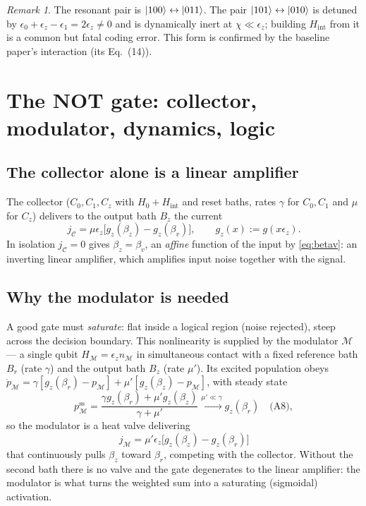 \documentclass[11pt,a4paper]{article}
\theoremstyle{plain}
\theoremstyle{definition}
\theoremstyle{remark}
\newtheorem{remark}{Remark}[section]
\newcommand{\calC}{\mathcal{C}}
\newcommand{\calM}{\mathcal{M}}
\newcommand{\gz}{g_z}
\begin{document}
\begin{remark}
The resonant pair is $\ket{100}\leftrightarrow\ket{011}$. The pair
$\ket{101}\leftrightarrow\ket{010}$ is detuned by
$\epsilon_0+\epsilon_z-\epsilon_1=2\epsilon_z\neq0$ and is dynamically
inert at $\chi\ll\epsilon_z$; building $H_{\mathrm{int}}$ from it is a
common but fatal coding error. This form is confirmed by the baseline
paper's interaction (its Eq.~(14)).
\end{remark}

\section{The NOT gate: collector, modulator, dynamics, logic}
\label{sec:notgate}

\subsection{The collector alone is a linear amplifier}
The collector ($C_0,C_1,C_z$ with $H_0+H_{\mathrm{int}}$ and reset baths,
rates $\gamma$ for $C_0,C_1$ and $\mu$ for $C_z$) delivers to the output
bath $B_z$ the current
\begin{equation}
j_{\calC}=\mu\epsilon_z\big[\gz(\beta_z)-\gz(\beta_v)\big],\qquad
\gz(x):=g(x\epsilon_z).
\label{eq:jC}
\end{equation}
In isolation $j_{\calC}=0$ gives $\beta_z=\beta_v$, an \emph{affine}
function of the input by \eqref{eq:betav}: an inverting linear amplifier,
which amplifies input noise together with the signal.

\subsection{Why the modulator is needed}
\label{sec:modulator}
A good gate must \emph{saturate}: flat inside a logical region (noise
rejected), steep across the decision boundary. This nonlinearity is
supplied by the modulator $\calM$ --- a single qubit
$H_\calM=\epsilon_z n_\calM$ in simultaneous contact with a fixed
reference bath $B_r$ (rate $\gamma$) and the output bath $B_z$ (rate
$\mu'$). Its excited population obeys
$\dot p_\calM=\gamma[\gz(\beta_r)-p_\calM]+\mu'[\gz(\beta_z)-p_\calM]$,
with steady state
\begin{equation}
p_\calM^{\mathrm{ss}}
=\frac{\gamma\gz(\beta_r)+\mu'\gz(\beta_z)}{\gamma+\mu'}
\xrightarrow{\mu'\ll\gamma}\gz(\beta_r)
\quad\text{(A8)},
\end{equation}
so the modulator is a heat valve delivering
\begin{equation}
j_\calM=\mu'\epsilon_z\big[\gz(\beta_z)-\gz(\beta_r)\big]
\label{eq:jM}
\end{equation}
that continuously pulls $\beta_z$ toward $\beta_r$, competing with the
collector. Without the second bath there is no valve and the gate
degenerates to the linear amplifier: the modulator is what turns the
weighted sum into a saturating (sigmoidal) activation.
\end{document}
